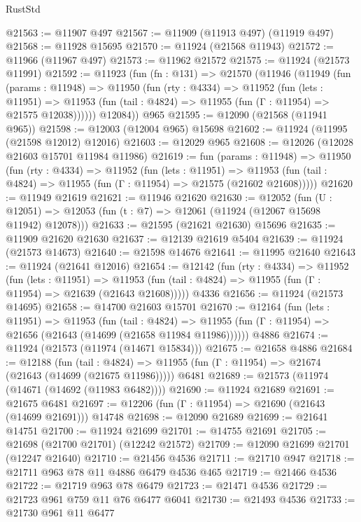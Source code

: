 \begin{lexlean}{RustStd}
\begin{coremodule}
{\begin{coremodule}
{{{{{{{{{{{{{{{{{{{{{{{{{{{{{{{{{{{{{{{{{{{{{{{{{{{{{{{{{{{{{{{{{{{{{{{{{{{{{{{{@21563 := @11907 @497
@21567 := @11909 (@11913 @497) (@11919 @497)
@21568 := @11928 @15695
@21570 := @11924 (@21568 @11943)
@21572 := @11966 (@11967 @497)
@21573 := @11962 @21572
@21575 := @11924 (@21573 @11991)
@21592 := @11923
    (fun (fn : @131) =>
    @21570
      (@11946
        (@11949
          (fun (params : @11948) =>
          @11950
            (fun (rty : @4334) =>
            @11952
              (fun (lets : @11951) =>
              @11953 (fun (tail : @4824) => @11955 (fun (Γ : @11954) => @21575 @12038))))))
        @12084))
    @965
@21595 := @12090 (@21568 (@11941 @965))
@21598 := @12003 (@12004 @965) @15698
@21602 := @11924 (@11995 (@21598 @12012) @12016)
@21603 := @12029 @965
@21608 := @12026 (@12028 @21603 @15701 @11984 @11986)
@21619 := fun (params : @11948) =>
  @11950
    (fun (rty : @4334) =>
    @11952
      (fun (lets : @11951) =>
      @11953 (fun (tail : @4824) => @11955 (fun (Γ : @11954) => @21575 (@21602 @21608)))))
@21620 := @11949 @21619
@21621 := @11946 @21620
@21630 := @12052
    (fun (U : @12051) => @12053 (fun (t : @7) => @12061 (@11924 (@12067 @15698 @11942) @12078)))
@21633 := @21595 (@21621 @21630) @15696
@21635 := @11909 @21620 @21630
@21637 := @12139 @21619 @5404
@21639 := @11924 (@21573 @14673)
@21640 := @21598 @14676
@21641 := @11995 @21640
@21643 := @11924 (@21641 @12016)
@21654 := @12142
    (fun (rty : @4334) =>
    @11952
      (fun (lets : @11951) =>
      @11953 (fun (tail : @4824) => @11955 (fun (Γ : @11954) => @21639 (@21643 @21608)))))
    @4336
@21656 := @11924 (@21573 @14695)
@21658 := @14700 @21603 @15701
@21670 := @12164
    (fun (lets : @11951) =>
    @11953
      (fun (tail : @4824) =>
      @11955 (fun (Γ : @11954) => @21656 (@21643 (@14699 (@21658 @11984 @11986))))))
    @4886
@21674 := @11924 (@21573 (@11974 (@14671 @15834)))
@21675 := @21658 @4886
@21684 := @12188
    (fun (tail : @4824) => @11955 (fun (Γ : @11954) => @21674 (@21643 (@14699 (@21675 @11986)))))
    @6481
@21689 := @21573 (@11974 (@14671 (@14692 (@11983 @6482))))
@21690 := @11924 @21689
@21691 := @21675 @6481
@21697 := @12206 (fun (Γ : @11954) => @21690 (@21643 (@14699 @21691))) @14748
@21698 := @12090 @21689
@21699 := @21641 @14751
@21700 := @11924 @21699
@21701 := @14755 @21691
@21705 := @21698 (@21700 @21701) (@12242 @21572)
@21709 := @12090 @21699 @21701 (@12247 @21640)
@21710 := @21456 @4536
@21711 := @21710 @947
@21718 := @21711 @963 @78 @11 @4886 @6479 @4536 @465
@21719 := @21466 @4536
@21722 := @21719 @963 @78 @6479
@21723 := @21471 @4536
@21729 := @21723 @961 @759 @11 @76 @6477 @6041
@21730 := @21493 @4536
@21733 := @21730 @961 @11 @6477
}}}}}}}}}}}}}}}}}}}}}}}}}}}}}}}}}}}}}}}}}}}}}}}}}}}}}}}}}}}}}}}}}}}}}}}}}}}}}}}}
\end{coremodule}}
\end{coremodule}
\end{lexlean}
